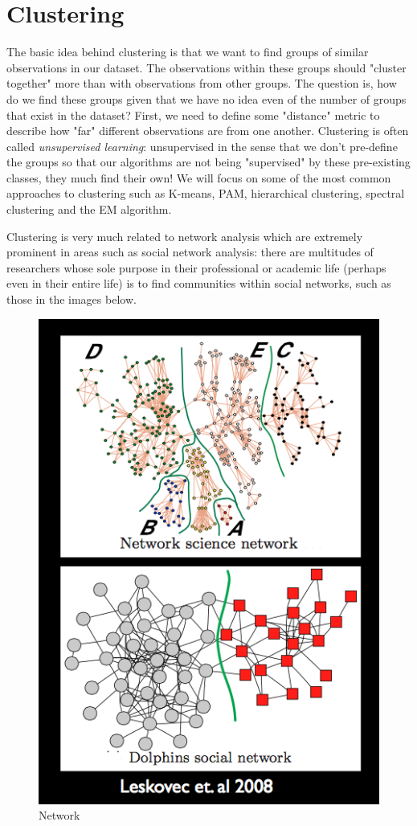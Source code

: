 

\chapter{Clustering}
\label{ch:clustering}


The basic idea behind clustering is that we want to find groups of similar observations in our dataset. The observations within these groups should "cluster together" more than with observations from other groups. The question is, how do we find these groups given that we have no idea even of the number of groups that exist in the dataset? First, we need to define some "distance" metric to describe how "far" different observations are from one another. Clustering is often called \emph{unsupervised learning}: unsupervised in the sense that we don't pre-define the groups so that our algorithms are not being "supervised" by these pre-existing classes, they much find their own! We will focus on some of the most common approaches to clustering such as K-means, PAM, hierarchical clustering, spectral clustering and the EM algorithm.

Clustering is very much related to network analysis which are extremely prominent in areas such as social network analysis: there are multitudes of researchers whose sole purpose in their professional or academic life (perhaps even in their entire life) is to find communities within social networks, such as those in the images below.


\begin{figure}[H]
\begin{center}
\includegraphics[scale=0.4]{network.png}
\end{center}
\caption{Network}
\label{fig:network}
\end{figure}

